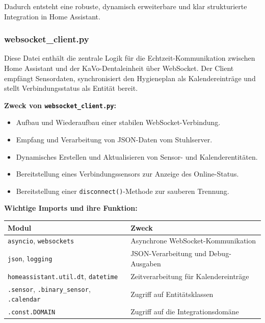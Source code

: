 Dadurch entsteht eine robuste, dynamisch erweiterbare und klar strukturierte Integration in Home Assistant.

\subsubsection{websocket\_client.py}

Diese Datei enthält die zentrale Logik für die Echtzeit-Kommunikation zwischen Home Assistant und der KaVo-Dentaleinheit über WebSocket. Der Client empfängt Sensordaten, synchronisiert den Hygieneplan als Kalendereinträge und stellt Verbindungsstatus als Entität bereit.

\vspace{0.5cm}

\textbf{Zweck von \texttt{websocket\_client.py}:}

\begin{itemize}
  \item Aufbau und Wiederaufbau einer stabilen WebSocket-Verbindung.\\
  \item Empfang und Verarbeitung von JSON-Daten vom Stuhlserver.\\
  \item Dynamisches Erstellen und Aktualisieren von Sensor- und Kalenderentitäten.\\
  \item Bereitstellung eines Verbindungssensors zur Anzeige des Online-Status.\\
  \item Bereitstellung einer \texttt{disconnect()}-Methode zur sauberen Trennung.
\end{itemize}

\vspace{0.5cm}

\textbf{Wichtige Imports und ihre Funktion:}

\begin{tabular}{|p{5cm}|p{9cm}|}
\hline
\textbf{Modul} & \textbf{Zweck} \\
\hline
\texttt{asyncio}, \texttt{websockets} & Asynchrone WebSocket-Kommunikation \\
\texttt{json}, \texttt{logging} & JSON-Verarbeitung und Debug-Ausgaben \\
\texttt{homeassistant.util.dt}, \texttt{datetime} & Zeitverarbeitung für Kalendereinträge \\
\texttt{.sensor}, \texttt{.binary\_sensor}, \texttt{.calendar} & Zugriff auf Entitätsklassen \\
\texttt{.const.DOMAIN} & Zugriff auf die Integrationsdomäne \\
\hline
\end{tabular}


